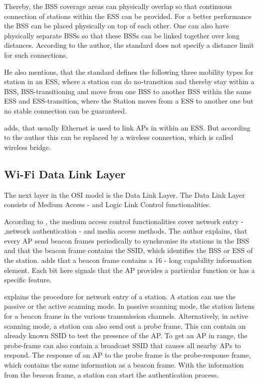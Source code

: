 \documentclass[]{nsm-thesis}
\begin{document}
Thereby, the BSS coverage areas can physically overlap so that continuous connection of stations within the ESS can be provided. For a better performance the \ac{BSS} can be placed physically on top of each other. One can also have physically separate \ac{BSS}s so that these \ac{BSS}s can be linked together over long distances. According to the author, the standard does not specify a distance limit for such connections. 

He also mentions, that the standard defines the following three mobility types for station in an \ac{ESS}, where a station can do no-transition and thereby stay within a \ac{BSS}, \ac{BSS}-transitioning and move from one \ac{BSS} to another \ac{BSS} within the same \ac{ESS} and \ac{ESS}-transition, where the Station moves from a \ac{ESS} to another one but no stable connection can be guaranteed.

\textcite{sauter_wireless_2022} adds, that usually Ethernet is used to link \ac{AP}s in within an \ac{ESS}. But according to the author this can be replaced by a wireless connection, which is called wireless bridge.





\subsection*{Wi-Fi Data Link Layer}

The next layer in the OSI model is the Data Link Layer.
The Data Link Layer consists of Medium Access - and Logic Link Control functionalities.


According to \textcite{kauffels_wireless_2002}, the medium access control functionalities cover network entry - ,network authentication - and media access methods.
The author explains, that every \ac{AP} send beacon frames periodically to synchronise its stations in the \ac{BSS} and that the beacon frame contains the \ac{SSID}, which identifies the \ac{BSS} or \ac{ESS} of the station. \textcite{sauter_wireless_2022} adds that a beacon frame contains a \SI{16}{\bit} - long capability information element. Each bit here signals that the \ac{AP} provides a particular function or has a specific feature. 

\textcite{kauffels_wireless_2002} explains the procedure for network entry of a station. A station can use the passive or the active scanning mode. In passive scanning mode, the station listens for a beacon frame in the various transmission channels. Alternatively, in active scanning mode, a station can also send out a probe frame. This can contain an already known \ac{SSID} to test the presence of the \ac{AP}. To get an \ac{AP} in range, the probe-frame can also contain a broadcast SSID that causes all nearby \ac{AP}s to respond. The response of an \ac{AP} to the probe frame is the probe-response frame, which contains the same information as a beacon frame. With the information from the beacon frame, a station can start the authentication process.
 
\end{document}
